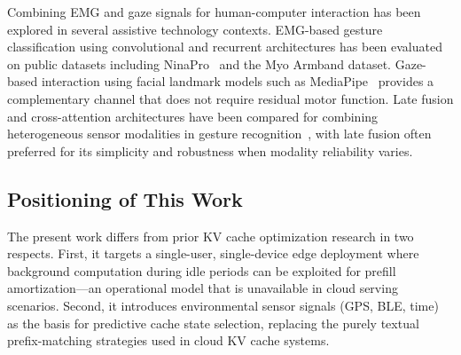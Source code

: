 Combining EMG and gaze signals for human-computer interaction has been explored in several assistive technology contexts. EMG-based gesture classification using convolutional and recurrent architectures has been evaluated on public datasets including NinaPro~\cite{ninapro} and the Myo Armband dataset. Gaze-based interaction using facial landmark models such as MediaPipe~\cite{mediapipe} provides a complementary channel that does not require residual motor function. Late fusion and cross-attention architectures have been compared for combining heterogeneous sensor modalities in gesture recognition~\cite{ngiam2011}, with late fusion often preferred for its simplicity and robustness when modality reliability varies.

\subsection{Positioning of This Work}
\label{sec:positioning}

The present work differs from prior KV cache optimization research in two respects. First, it targets a single-user, single-device edge deployment where background computation during idle periods can be exploited for prefill amortization---an operational model that is unavailable in cloud serving scenarios. Second, it introduces environmental sensor signals (GPS, BLE, time) as the basis for predictive cache state selection, replacing the purely textual prefix-matching strategies used in cloud KV cache systems.
